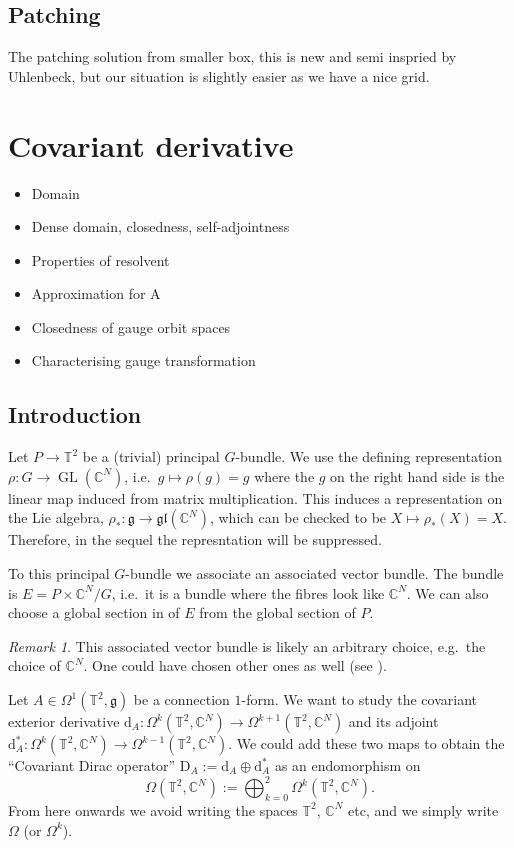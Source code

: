 \documentclass[12pt]{article}
\numberwithin{equation}{section}
\theoremstyle{definition}
\theoremstyle{remark}
\newtheorem{remark}[theorem]{Remark}
\newcommand{\diff}{\mathrm{d}}
\newcommand{\1}{\mathbf 1}
\newcommand{\<}{\langle}
\renewcommand{\>}{\rangle}
\newcommand{\rmD}{\mathrm{D}}
\newcommand{\fg}{\mathfrak g}
\newcommand{\bC}{\mathbb C}
\newcommand{\T}{\mathbb T}
\newcommand{\bT}{\mathbb T}
\begin{document}
\subsection{Patching}
The patching solution from smaller box, this is new and semi inspried by Uhlenbeck, but our situation is slightly easier as we have a nice grid.  


\section{Covariant derivative}
\begin{itemize}
    \item Domain
    \item Dense domain, closedness, self-adjointness
    \item Properties of resolvent
    \item Approximation for A
    \item Closedness of gauge orbit spaces
    \item Characterising gauge transformation
\end{itemize}
\subsection{Introduction}
 Let $P\to \T^2$ be a (trivial) principal $G$-bundle.  We use the defining representation $\rho:G\to \operatorname{GL}(\bC^N)$, i.e.\ $g\mapsto\rho(g)=g$ where the $g$ on the right hand side is the linear map induced from matrix multiplication. This induces a representation on the Lie algebra, $\rho_*:\fg\to \mathfrak{gl}(\bC^N)$, which can be checked to be $X\mapsto \rho_*(X)=X$. Therefore, in the sequel the represntation will be suppressed. 

To this principal $G$-bundle we associate an associated vector bundle. The bundle is $E=P\times \bC^N/G$, i.e.\ it is a bundle where the fibres look like $\bC^N$. We can also choose a global section in of $E$ from the global section of $P$.  


\begin{remark}
    This associated vector bundle is likely an arbitrary choice, e.g.\ the choice of $\bC^N$. One could have chosen other ones as well (see ).
\end{remark}

Let $A\in\Omega^1(\bT^2,\fg)$ be a connection $1$-form. We want to study the covariant exterior derivative $\diff_A:\Omega^k(\bT^2,\bC^N)\to \Omega^{k+1}(\bT^2,\bC^N)$ and its adjoint $\diff^*_A:\Omega^k(\bT^2,\bC^N)\to \Omega^{k-1}(\bT^2,\bC^N)$. We could add these two maps to obtain the ``Covariant Dirac operator'' $\rmD_A:= \diff_A\oplus\diff_A^*$ as an endomorphism on 
\[
\Omega(\bT^2,\bC^N):=\bigoplus_{k=0}^2 \Omega^k(\bT^2,\bC^N).
\]
From here onwards we avoid writing the spaces $\bT^2$, $\bC^N$ etc, and we simply write $\Omega$ (or $\Omega^k$). 
\end{document}
